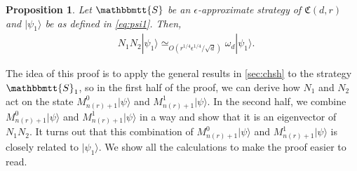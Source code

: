 \documentclass[11pt,letterpaper]{article}
\newcommand{\ket}[1]{|#1\rangle}
\newcommand{\1}{\mathbb{1}}
\newcommand{\nr}{n(r)}
\newcommand{\fC}{\mathfrak{C}}
\newcommand{\bS}{\mathbbmtt{S}}
\newcommand{\ep}{\epsilon}
\newcommand{\qe}{\epsilon^{1/4}}
\newcommand{\sd}{\sqrt{d}}
\newcommand{\sr}{\sqrt{r}}
\newcommand{\qr}{r^{1/4}}
\newcommand{\appd}[1]{\simeq_{#1}}
\newtheorem{proposition}[theorem]{Proposition}
\theoremstyle{definition}
\begin{document}
\begin{proposition}
    \label{prop:psi1_eig1}
	Let $\bS$ be an $\ep$-approximate strategy of $\fC(d,r)$ and $\ket{\psi_1}$ be as defined in
	\cref{eq:psi1}.
	Then,
	\begin{align}
	    \label{eq:psi1_eig1} 
	    &N_1N_2 \ket{\psi_1} \appd{O(\qr \qe/\sd)} \omega_d\ket{\psi_1}.
	\end{align}
\end{proposition}
The idea of this proof is to apply the general results in \cref{sec:chsh}
to the strategy $\bS_1$,
so in the first half of the proof, we can derive how $N_1$ and $N_2$
act on the state $M_{\nr+1}^0 \ket{\psi}$ and $M_{\nr+1}^1 \ket{\psi}$.
In the second half, we combine $M_{\nr+1}^0 \ket{\psi}$ and $M_{\nr+1}^1 \ket{\psi}$ in a way and show that it is an eigenvector of $N_1N_2$.
It turns out that this combination of $M_{\nr+1}^0 \ket{\psi}$ and $M_{\nr+1}^1 \ket{\psi}$
is closely related to $\ket{\psi_1}$.
We show all the calculations to make the proof easier to read. 
\end{document}

